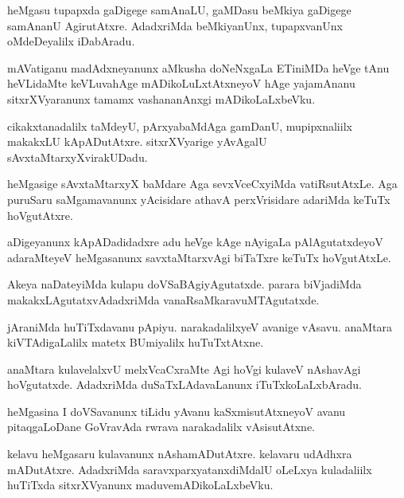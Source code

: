 \documentclass{article}
\begin{document}
\begin{mng}%
heMgasu tupapxda gaDigege samAnaLU, gaMDasu beMkiya gaDigege
samAnanU AgirutAtxre. AdadxriMda beMkiyanUnx, tupapxvanUnx oMdeDeyalilx
iDabAradu.
\end{mng}

\begin{mng}%
mAVatiganu madAdxneyanunx aMkusha doNeNxgaLa ETiniMDa
heVge tAnu heVLidaMte keVLuvahAge mADikoLuLxtAtxneyoV hAge yajamAnanu
sitxrXVyaranunx tamamx vashananAnxgi mADikoLaLxbeVku.
\end{mng}

\begin{mng}%
cikakxtanadalilx taMdeyU, pArxyabaMdAga gamDanU, mupipxnaliilx
makakxLU kApADutAtxre. sitxrXVyarige yAvAgalU sAvxtaMtarxyXvirakUDadu.
\end{mng}

\begin{mng}%
heMgasige sAvxtaMtarxyX baMdare Aga sevxVceCxyiMda vatiRsutAtxLe.
Aga puruSaru saMgamavanunx yAcisidare athavA perxVrisidare adariMda keTuTx
hoVgutAtxre.
\end{mng}

\begin{mng}%
aDigeyanunx kApADadidadxre adu heVge kAge nAyigaLa
pAlAgutatxdeyoV adaraMteyeV heMgasanunx savxtaMtarxvAgi biTaTxre keTuTx
hoVgutAtxLe.
\end{mng}

\begin{mng}%
Akeya naDateyiMda kulapu doVSaBAgiyAgutatxde. parara
biVjadiMda makakxLAgutatxvAdadxriMda vanaRsaMkaravuMTAgutatxde.
\end{mng}

\begin{mng}%
jAraniMda huTiTxdavanu pApiyu. narakadalilxyeV avanige
vAsavu. anaMtara kiVTAdigaLalilx matetx BUmiyalilx huTuTxtAtxne.
\end{mng}

\begin{mng}%
anaMtara kulavelalxvU melxVcaCxraMte Agi hoVgi kulaveV nAshavAgi
hoVgutatxde. AdadxriMda duSaTxLAdavaLanunx iTuTxkoLaLxbAradu.
\end{mng}

\begin{mng}%
heMgasina I doVSavanunx tiLidu yAvanu kaSxmisutAtxneyoV
avanu pitaqgaLoDane GoVravAda rwrava narakadalilx vAsisutAtxne.
\end{mng}

\begin{mng}%
kelavu heMgasaru kulavanunx nAshamADutAtxre. kelavaru udAdhxra
mADutAtxre. AdadxriMda saravxparxyatanxdiMdalU oLeLxya kuladaliilx huTiTxda
sitxrXVyanunx maduvemADikoLaLxbeVku.
\end{mng}
\end{document}
